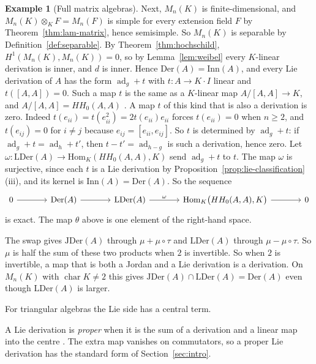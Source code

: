 \documentclass[]{interact}
\theoremstyle{plain}
\theoremstyle{definition}
\newtheorem{example}[theorem]{Example}
\theoremstyle{remark}
\newcommand{\Der}{\mathrm{Der}}
\newcommand{\Inn}{\mathrm{Inn}}
\newcommand{\JDer}{\mathrm{JDer}}
\newcommand{\LDer}{\mathrm{LDer}}
\begin{document}
\begin{example}[Full matrix algebras]
Next, $M_n(K)$ is finite-dimensional, and $M_n(K) \otimes_K F = M_n(F)$ is simple for every extension field $F$ by Theorem~\ref{thm:lam-matrix}, hence semisimple. %
So $M_n(K)$ is separable by Definition~\ref{def:separable}.
By Theorem~\ref{thm:hochschild}, $H^1(M_n(K), M_n(K)) = 0$, so by Lemma~\ref{lem:weibel} every $K$-linear derivation is inner, and $d$ is inner.
Hence $\Der(A) = \Inn(A)$, and every Lie derivation of $A$ has the form $\operatorname{ad}_g + t$ with $t \colon A \to K \cdot I$ linear and $t([A,A]) = 0$.
Such a map $t$ is the same as a $K$-linear map $A/[A,A] \to K$, and $A/[A,A] = HH_0(A,A)$ \citep[\S9.1]{Weibel1994}.
A map $t$ of this kind that is also a derivation is zero.
Indeed $t(e_{ii}) = t(e_{ii}^2) = 2t(e_{ii})e_{ii}$ forces $t(e_{ii}) = 0$ when $n \geq 2$, and $t(e_{ij}) = 0$ for $i \neq j$ because $e_{ij} = [e_{ii}, e_{ij}]$.
So $t$ is determined by $\operatorname{ad}_g + t$: if $\operatorname{ad}_g + t = \operatorname{ad}_h + t'$, then $t - t' = \operatorname{ad}_{h-g}$ is such a derivation, hence zero.
Let $\omega \colon \LDer(A) \to \mathrm{Hom}_K(HH_0(A,A), K)$ send $\operatorname{ad}_g + t$ to $t$.
The map $\omega$ is surjective, since each $t$ is a Lie derivation by Proposition~\ref{prop:lie-classification}(iii), and its kernel is $\Inn(A) = \Der(A)$.
So the sequence
\[
\begin{tikzcd}[column sep=large]
0 \arrow[r] & \Der(A) \arrow[r] & \LDer(A) \arrow[r, "\omega"] & \mathrm{Hom}_K\bigl(HH_0(A,A), K\bigr) \arrow[r] & 0
\end{tikzcd}
\]
is exact.
The map $\theta$ above is one element of the right-hand space.
\end{example}

The swap gives $\JDer(A)$ through $\mu + \mu \circ \tau$ and $\LDer(A)$ through $\mu - \mu \circ \tau$.
So $\mu$ is half the sum of these two products when $2$ is invertible.
So when $2$ is invertible, a map that is both a Jordan and a Lie derivation is a derivation.
On $M_n(K)$ with $\operatorname{char} K \neq 2$ this gives $\JDer(A) \cap \LDer(A) = \Der(A)$ even though $\LDer(A)$ is larger.

For triangular algebras the Lie side has a central term.

A Lie derivation is \emph{proper} when it is the sum of a derivation and a linear map into the centre \citep[\S1]{Cheung2003}.
The extra map vanishes on commutators, so a proper Lie derivation has the standard form of Section~\ref{sec:intro}.
\end{document}
